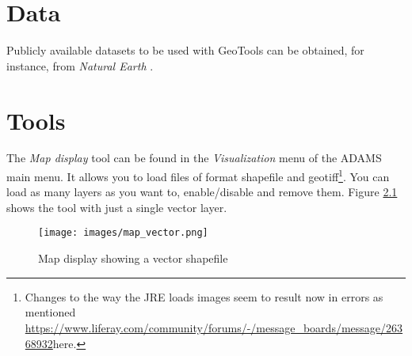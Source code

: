 \documentclass[a4paper]{book}
\begin{document}
\chapter{Data}
Publicly available datasets to be used with GeoTools can be obtained, for
instance, from \textit{Natural Earth} \cite{naturalearth}.

\chapter{Tools}
The \textit{Map display} tool can be found in the \textit{Visualization} menu
of the ADAMS main menu. It allows you to load files of format shapefile and 
geotiff\footnote{Changes to the way the JRE loads images seem to result now
in errors as mentioned \url{https://www.liferay.com/community/forums/-/message_boards/message/26368932}{here}.}.
You can load as many layers as you want to, enable/disable and remove them.
Figure \ref{mapdisplay-vector} shows the tool with just a single vector layer.

\begin{figure}[htb]
  \centering
  \texttt{[image: images/map\_vector.png]}
  \caption{Map display showing a vector shapefile}
  \label{mapdisplay-vector}
\end{figure}


\end{document}
